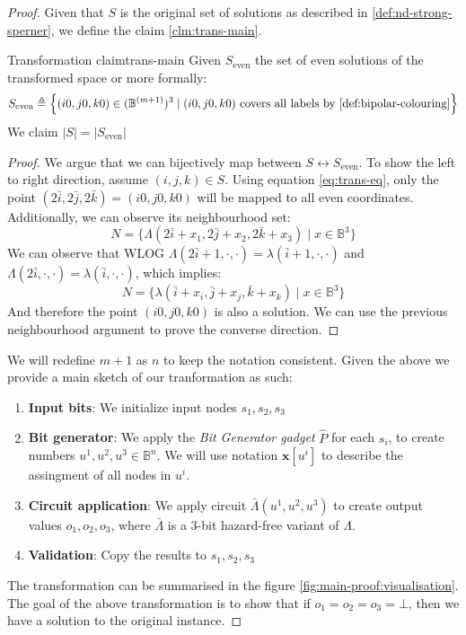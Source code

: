 \begin{proof}
Given that $S$ is the original set of solutions as described in \ref{def:nd-strong-sperner}, we define the claim \ref{clm:trans-main}.

\begin{claimbox}{Transformation claim}{trans-main}
    \label{clm:main-proof:trans-claim}
    Given $S_{\text{even}}$ the set of even solutions of the transformed space or more formally:
    $$
        S_{\text{even}} \triangleq
        \Big\{(i0,j0,k0) \in (\mathbb{B}^{(m+1)})^3 \mid (i0,j0,k0) \text{ covers all labels by \ref{def:bipolar-colouring}} \Big\}
    $$
    We claim $|S| = |S_{\text{even}}|$
\end{claimbox}

\begin{proof}
    We argue that we can bijectively map between $S \leftrightarrow S_{\text{even}}$.
    To show the left to right direction, assume $(i,j,k) \in S$.
    Using equation \ref{eq:trans-eq}, only the point $(2\bar{i}, 2\bar{j}, 2\bar{k}) = (i0, j0,k0)$ will be mapped to all even coordinates.
    Additionally, we can observe its neighbourhood set:
    $$
    N = \Big\{\Lambda(2\bar{i} + x_1, 2\bar{j} + x_2, 2\bar{k} + x_3) \mid x \in \mathbb{B}^3 \Big\}
    $$
    We can observe that WLOG $\Lambda(2\bar{i} + 1, \cdot, \cdot) = \lambda(\bar{i} + 1, \cdot, \cdot)$ and
    $\Lambda(2\bar{i}, \cdot, \cdot) = \lambda(\bar{i}, \cdot, \cdot)$, which implies:
    $$
    N = \Big\{\lambda(\bar{i} + x_i, \bar{j} + x_j, \bar{k} + x_k) \mid x \in \mathbb{B}^3 \Big\}
    $$
    And therefore the point $(i0, j0,k0)$ is also a solution. We can use the previous neighbourhood argument to prove the converse direction.
\end{proof}
We will redefine $m + 1$ as $n$ to keep the notation consistent.
Given the above we provide a main sketch of our tranformation as such:
\begin{enumerate}
    \item \textbf{Input bits}: We initialize input nodes $s_1, s_2, s_3$
    \item \textbf{Bit generator}: We apply the \textit{Bit Generator gadget} $\hat{P}$ for each $s_i$,
        to create numbers $u^1, u^2, u^3 \in \mathbb{B}^{n}$.  We will use notation $\mathbf{x}[u^i]$ to
        describe the assingment of all nodes in $u^i$.
    \item \textbf{Circuit application}: We apply circuit $\bar{\Lambda}(u^1, u^2, u^3)$ to create output values $o_1, o_2, o_3$, where 
$\bar{\Lambda}$ is a 3-bit hazard-free variant of $\Lambda$.
    \item \textbf{Validation}: Copy the results to $s_1, s_2, s_3$
\end{enumerate}
The transformation can be summarised in the figure \ref{fig:main-proof:visualisation}.
The goal of the above transformation is to show that if $o_1 = o_2 =o_3 = \bot$, then we have a solution
to the original instance.


\end{proof}
